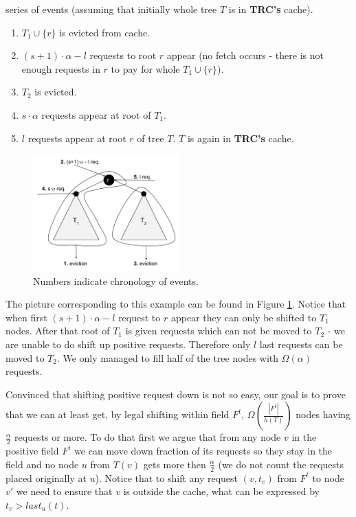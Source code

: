 series of events (assuming that initially whole tree $T$ is in \textbf{TRC's} 
cache).
\begin{enumerate}
 \item $T_1 \cup \{r\}$ is evicted from cache.
 \item $(s+1) \cdot \alpha - l$ requests to root $r$ appear (no fetch occurs - 
there is not enough requests in $r$ to pay for whole $T_1 \cup \{r\}$).
 \item $T_2$ is evicted.
 \item $s \cdot \alpha$ requests appear at root of $T_1$.
 \item $l$ requests appear at root $r$ of tree $T$. $T$ is again in 
\textbf{TRC's} cache.
\end{enumerate}
\begin{figure}
\vspace{-20pt}
 \begin{center}
  \includegraphics[width=0.5\textwidth]{example_not_even.png}
\end{center}
\caption{Numbers indicate chronology of events.}
\vspace{-20pt}
\label{fig:example_not_even}
\end{figure}
The picture corresponding to this example can be found in Figure 
\ref{fig:example_not_even}. 
Notice that when first $(s+1) \cdot \alpha - l$ request to $r$ appear they can 
only be shifted to $T_1$ nodes. After that root of $T_1$ is given requests 
which can not be moved to $T_2$ - we are unable to do shift up positive 
requests. Therefore only $l$ last requests can be moved to 
$T_2$. We only managed to fill half of the tree nodes with $\Omega(\alpha)$ 
requests.   

Convinced that shifting positive request down is not so easy, our goal is to 
prove that we can at least get, by legal shifting within field $F^t$, 
$\Omega(\frac{|F^t|}{h(T)})$ nodes having $\frac{\alpha}{2}$ 
requests or more. To do that first we argue that from any node $v$ in the 
positive 
field $F^t$ we can move down fraction of its requests so they stay in the field 
and no node $u$ from $T(v)$ gets more then $\frac{\alpha}{2}$ (we do not count 
the requests placed originally at $u$). Notice that to shift any request $(v, 
t_v)$ from $F^t$ to node $v'$ we need to ensure that $v$ is outside the cache, 
what can be expressed by $t_v > last_u(t)$.

